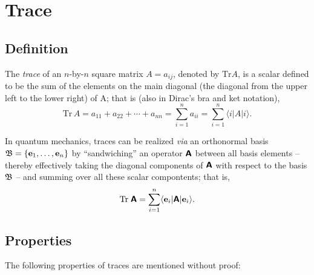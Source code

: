 \section{Trace}
\label{2013-ch-fdvs-trace}

\subsection{Definition}
The {\em trace} of an $n$-by-$n$ square matrix $A=a_{ij}$, denoted by
$\textrm{Tr} A$,  is a scalar
defined to be the sum of the elements on the main diagonal
 (the diagonal from the upper left to the lower right) of A; that is  (also in Dirac's bra and ket notation),
\begin{equation}
\textrm{Tr}\,A
= a_{11} +a_{22}+ \cdots +a_{nn}
=\sum_{i=1}^n a_{ii}=\sum_{i=1}^n \langle i \vert A\vert i \rangle.
\end{equation}

In quantum mechanics, traces can be realized {\it via} an orthonormal basis ${\frak B} =\{
{\bf e}_1,
\ldots ,
{\bf e}_n
\}$
by ``sandwiching'' an operator $\textsf{\textbf{A}}$ between all basis elements -- thereby effectively taking the diagonal components
of    $\textsf{\textbf{A}}$ with respect to the basis ${\frak B}$ --
and summing over all these scalar compontents; that is,
\begin{equation}
\textrm{Tr}\;\textsf{\textbf{A}}
=\sum_{i=1}^n   \langle {\bf e}_i \vert \textsf{\textbf{A}} \vert {\bf e}_i \rangle.
\end{equation}

\subsection{Properties}

The following properties of traces are mentioned without proof:

